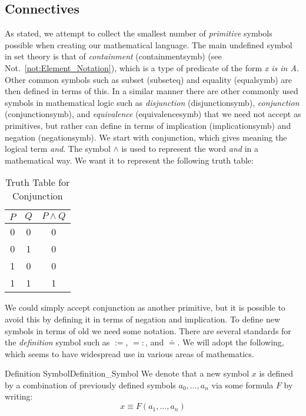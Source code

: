     \subsection{Connectives}
        As stated, we attempt to collect the smallest number of
        \textit{primitive} symbols possible when creating our mathematical
        language. The main undefined symbol in set theory is that of
        \textit{containment} (\gls{containmentsymb}) (see
        Not.~\ref{not:Element_Notation}), which is a type of \gls{predicate} of
        the form \textit{x is in A}. Other common symbols such as subset
        (\gls{subseteq}) and equality (\gls{equalsymb}) are then defined in
        terms of this. In a similar manner there are other commonly used symbols
        in mathematical logic such as \textit{disjunction}
        (\gls{disjunctionsymb}), \textit{conjunction} (\gls{conjunctionsymb}),
        and \textit{equivalence} (\gls{equivalencesymb}) that we need not accept
        as primitives, but rather can define in terms of implication
        (\gls{implicationsymb}) and negation (\gls{negationsymb}). We start with
        conjunction, which gives meaning the logical term \textit{and}.
        The symbol $\land$ is used to represent the word \textit{and} in a
        mathematical way. We want it to represent the following truth table:
        \begin{table}[H]
            \centering
            \captionsetup{type=table}
            \begin{tabular}{ccc}
                $P$&$Q$&$P\land{Q}$\\
                \hline
                0&0&0\\
                0&1&0\\
                1&0&0\\
                1&1&1
            \end{tabular}
            \caption{Truth Table for Conjunction}
            \label{tab:Truth_Table_for_Conjunction}
        \end{table}
        We could simply accept conjunction as another primitive, but it is
        possible to avoid this by defining it in terms of negation and
        implication. To define new symbols in terms of old we need some
        notation. There are several standards for the \textit{definition} symbol
        such as $:=$, $=:$, and $\doteq$. We will adopt the following, which
        seems to have widespread use in various areas of mathematics.
        \begin{fnotation}{Definition Symbol}{Definition_Symbol}
            We denote that a new symbol $x$ is defined by a combination of
            previously defined symbols $a_{0},\dots,a_{n}$ via some formula $F$
            by writing:
            \begin{equation*}
                x\equiv{F}(a_{1},\dots,a_{n})
            \end{equation*}
        \end{fnotation}
